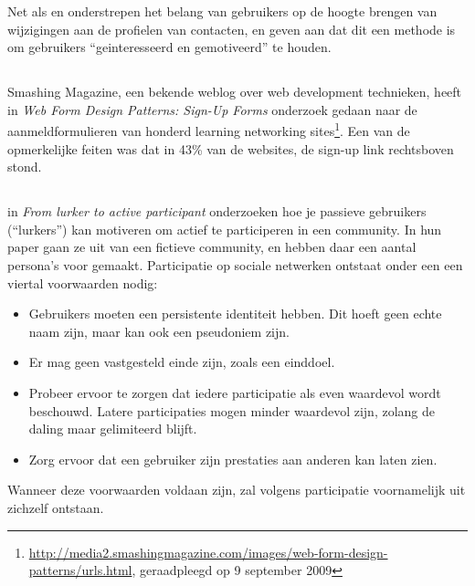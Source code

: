 \documentclass[a4paper, 10pt, pdftex]{report}
\begin{document}
    Net als \citet{Berlanga2007} en \citet{Sohn2005} onderstrepen \citeauthor{Brouns2008} het belang van gebruikers op de hoogte brengen van wijzigingen aan de profielen van contacten, en geven aan dat dit een methode is om gebruikers ``geinteresseerd en gemotiveerd'' te houden.

    \subsection{\cite{Editorial2008}}

    Smashing Magazine, een bekende weblog over web development technieken, heeft in \emph{Web Form Design Patterns: Sign-Up Forms} onderzoek gedaan naar de aanmeldformulieren van honderd learning networking sites\footnote{\url{http://media2.smashingmagazine.com/images/web-form-design-patterns/urls.html}, geraadpleegd op 9 september 2009}. Een van de opmerkelijke feiten was dat in 43\% van de websites, de sign-up link rechtsboven stond.

    \subsection{\cite{Sloep2009}}

    in \emph{From lurker to active participant} onderzoeken \citeauthor{Sloep2009} hoe je passieve gebruikers (``lurkers'') kan motiveren om actief te participeren in een community. In hun paper gaan ze uit van een fictieve community, en hebben daar een aantal persona's voor gemaakt. Participatie op sociale netwerken ontstaat onder een een viertal voorwaarden nodig:
    \begin{itemize}
    \item Gebruikers moeten een persistente identiteit hebben. Dit hoeft geen echte naam zijn, maar kan ook een pseudoniem zijn.
    \item Er mag geen vastgesteld einde zijn, zoals een einddoel.
    \item Probeer ervoor te zorgen dat iedere participatie als even waardevol wordt beschouwd. Latere participaties mogen minder waardevol zijn, zolang de daling maar gelimiteerd blijft.
    \item Zorg ervoor dat een gebruiker zijn prestaties aan anderen kan laten zien.
  \end{itemize}
    Wanneer deze voorwaarden voldaan zijn, zal volgens \citeauthor{Sloep2009} participatie voornamelijk uit zichzelf ontstaan.
\end{document}
